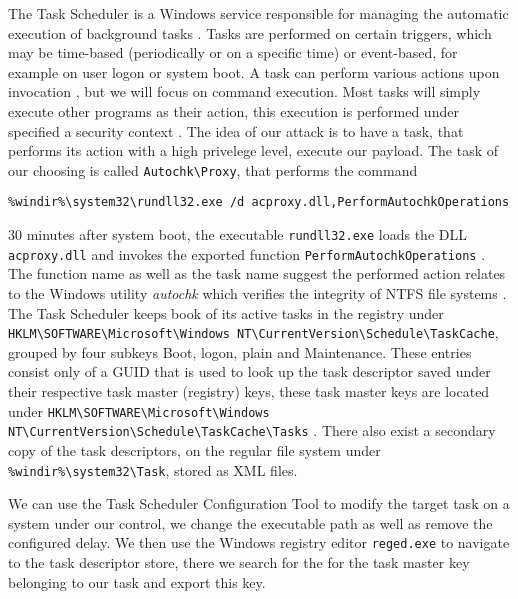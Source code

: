 

The Task Scheduler is a Windows service responsible for managing the automatic execution of background tasks \cite[10. The Task Scheduler]{windows-internals-7-part2}. Tasks are performed on certain triggers, which may be time-based (periodically or on a specific time) or event-based, for example on user logon or system boot\cite{microsoft-task-scheduler-triggers}. A task can perform various actions upon invocation \cite{microsoft-task-scheduler-actions}, but we will focus on command execution. Most tasks will simply execute other programs as their action, this execution is performed under specified a security context \cite{microsoft-task-scheduler-security-contexts}. The idea of our attack is to have a task, that performs its action with a high privelege level, execute our payload. The task of our choosing is called \lstinline{Autochk\Proxy}, that performs the command

\begin{lstlisting}
%windir%\system32\rundll32.exe /d acproxy.dll,PerformAutochkOperations
\end{lstlisting}

30 minutes after system boot, the executable \lstinline{rundll32.exe} loads the \ac{DLL} \lstinline{acproxy.dll} and invokes the exported function \lstinline{PerformAutochkOperations} \cite{microsoft-rundll32}. The function name as well as the task name suggest the performed action relates to the Windows utility \emph{autochk} which verifies the integrity of \ac{NTFS} file systems \cite{microsoft-autochk}. The Task Scheduler keeps book of its active tasks in the registry under \lstinline{HKLM\SOFTWARE\Microsoft\Windows NT\CurrentVersion\Schedule\TaskCache}, grouped by four subkeys Boot, logon, plain and Maintenance. These entries consist only of a \ac{GUID} that is used to look up the task descriptor saved under their respective task master (registry) keys, these task master keys are located under \lstinline{HKLM\SOFTWARE\Microsoft\Windows NT\CurrentVersion\Schedule\TaskCache\Tasks} \cite[10. The Task Scheduler - Initialization]{windows-internals-7-part2}. There also exist a secondary copy of the task descriptors, on the regular file system under \lstinline{%windir%\system32\Task}, stored as \ac{XML} files.

We can use the Task Scheduler Configuration Tool to modify the target task on a system under our control, we change the executable path as well as remove the configured delay. We then use the Windows registry editor \lstinline{reged.exe} to navigate to the task descriptor store, there we search for the for the task master key belonging to our task and export this key.

